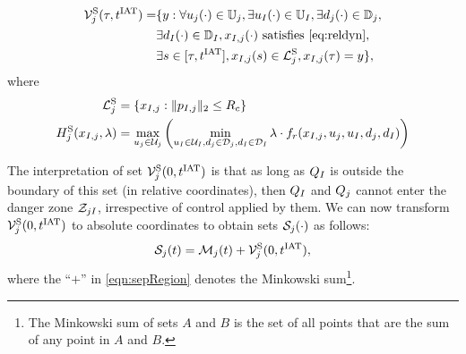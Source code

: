 \begin{equation} \label{eqn:sepBRS}
\begin{aligned}
\brs^{\text{S}}_{j}(\tau, \iat) = & \{y: \forall \ctrl_j(\cdot) \in \cfset_j, \exists \ctrl_\intr(\cdot) \in \cfset_\intr, \exists \dstb_j(\cdot) \in \dfset_j, \\
& \exists \dstb_\intr(\cdot) \in \dfset_\intr, \state_{\intr, j}(\cdot) \text{ satisfies \eqref{eq:reldyn}},\\
& \exists s \in [\tau, \iat], \state_{\intr, j}(s) \in \targetset^{\text{S}}_{j}, \state_{\intr, j}(\tau) = y\},
\end{aligned}
\end{equation}
where 
\begin{equation}
\begin{aligned}
\mathcal{L}^{\text{S}}_{j} &= \{x_{I, j}: \|p_{I, j}\|_2 \le R_c\} \\
H^{\text{S}}_{j}(x_{I, j}, \lambda) &= \max_{u_j \in \mathcal{U}_j} \left( \min_{u_I \in \mathcal{U}_I, d_j \in \mathcal{D}_j, d_I \in \mathcal{D}_I} \lambda \cdot f_r(x_{I, j}, u_j, u_I, d_j, d_I) \right)
\end{aligned}
\end{equation}

The interpretation of set $\mathcal{V}^{\text{S}}_{j}(0, t^\text{IAT})$ is that as long as $Q_{I}$ is outside the boundary of this set (in relative coordinates), then $Q_{I}$ and $Q_{j}$ cannot enter the danger zone $\mathcal{Z}_{jI}$, irrespective of control applied by them. We can now transform $\mathcal{V}^{\text{S}}_{j}(0, t^\text{IAT})$ to absolute coordinates to obtain sets $\mathcal{S}_j(\cdot)$ as follows:
\begin{equation} \label{eqn:sepRegion}
\sep_j(t) = \boset_j(t) + \brs^{\text{S}}_{j}(0, \iat),
\end{equation}
where the ``$+$'' in \eqref{eqn:sepRegion} denotes the Minkowski sum\footnote{The Minkowski sum of sets $A$ and $B$ is the set of all points that are the sum of any point in $A$ and $B$.}.